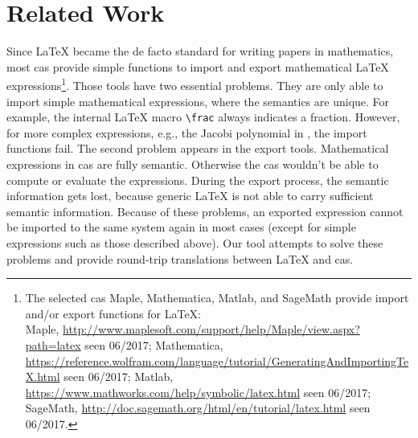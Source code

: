 \documentclass[a4paper,11pt]{article}
\theoremstyle{defTheoStyle}
\theoremstyle{defExampStyle}
\begin{document}
\section{Related Work}\label{sec:related-work}
Since \LaTeX{} became the de facto standard for writing papers in mathematics, most \gls*{cas} provide simple functions to import and export mathematical \LaTeX{} expressions\footnote{The selected \gls*{cas} Maple, Mathematica, Matlab, and SageMath provide import and/or export functions for \LaTeX:\\
Maple, \url{http://www.maplesoft.com/support/help/Maple/view.aspx?path=latex} seen 06/2017;
Mathematica, \url{https://reference.wolfram.com/language/tutorial/GeneratingAndImportingTeX.html} seen 06/2017;
Matlab, \url{https://www.mathworks.com/help/symbolic/latex.html} seen 06/2017;
SageMath, \url{http://doc.sagemath.org/html/en/tutorial/latex.html} seen 06/2017.}. Those tools have two essential problems. They are only able to import simple mathematical expressions, where the semantics are unique. For example, the internal \LaTeX{} macro \verb|\frac| always indicates a fraction. However, for more complex expressions, e.g., the Jacobi polynomial in , the import functions fail. The second problem appears in the export tools. Mathematical expressions in \gls*{cas} are fully semantic. Otherwise the \gls*{cas} wouldn't be able to compute or evaluate the expressions. During the export process, the semantic information gets lost, because generic \LaTeX{} is not able to carry sufficient semantic information. Because of these problems, an exported expression cannot be imported to the same system again in most cases (except for simple expressions such as those described above). Our tool attempts to solve these problems and provide round-trip translations between \LaTeX{} and \gls*{cas}.
\end{document}

